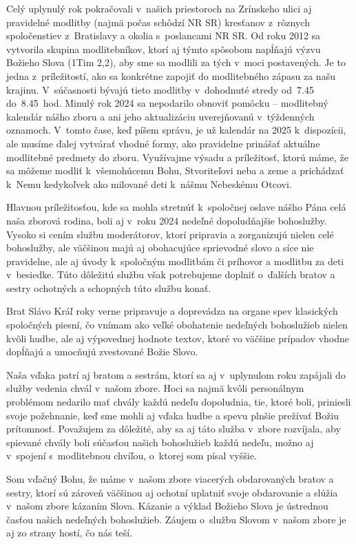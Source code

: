 Celý uplynulý rok pokračovali v~našich priestoroch na Zrínskeho ulici aj pravidelné modlitby (najmä počas schôdzí NR SR) kresťanov z~rôznych spoločenstiev z~Bratislavy a okolia s~poslancami NR SR. Od roku 2012 sa vytvorila skupina modlitebníkov, ktorí aj týmto spôsobom napĺňajú výzvu Božieho Slova (1Tim 2,2), aby sme sa modlili za tých v~moci postavených. Je to jedna z~príležitostí, ako sa konkrétne zapojiť do modlitebného zápasu za našu krajinu. V~súčasnosti bývajú tieto modlitby v~dohodnuté stredy od~7.45 do~8.45~hod.
Minulý rok 2024 sa nepodarilo obnoviť pomôcku -- modlitebný kalendár nášho zboru a ani jeho aktualizáciu uverejňovanú v~týždenných oznamoch. V~tomto čase, keď píšem správu, je už kalendár na 2025 k~dispozícii, ale musíme ďalej vytvárať vhodné formy, ako pravidelne prinášať aktuálne modlitebné predmety do zboru.
Využívajme výsadu a príležitosť, ktorú máme, že sa môžeme modliť k~všemohúcemu Bohu, Stvoriteľovi neba a zeme a prichádzať k~Nemu kedykoľvek ako milované deti k~nášmu Nebeskému Otcovi.


Hlavnou príležitosťou, kde sa mohla stretnúť k~spoločnej oslave nášho Pána celá naša zborová rodina, boli aj v~roku 2024 nedeľné dopoludňajšie bohoslužby. Vysoko si cením službu moderátorov, ktorí pripravia a zorganizujú nielen celé bohoslužby, ale väčšinou majú aj obohacujúce sprievodné slovo a síce nie pravidelne, ale aj úvody k~spoločným modlitbám či príhovor a modlitbu za deti v~besiedke. Túto dôležitú službu však potrebujeme doplniť o~ďalších bratov a sestry ochotných a schopných túto službu konať.

Brat Slávo Kráľ roky verne pripravuje a doprevádza na organe spev klasických spoločných piesní, čo vnímam ako veľké obohatenie nedeľných bohoslužieb nielen kvôli hudbe, ale aj výpovednej hodnote textov, ktoré vo väčšine prípadov vhodne dopĺňajú a umocňujú zvestované Božie Slovo.

Naša vďaka patrí aj bratom a sestrám, ktorí sa aj v~uplynulom roku zapájali do služby vedenia chvál v~našom zbore. Hoci sa najmä kvôli personálnym problémom nedarilo mať chvály každú nedeľu dopoludnia, tie, ktoré boli, priniesli svoje požehnanie, keď sme mohli aj vďaka hudbe a spevu plnšie prežívať Božiu prítomnosť. Považujem za dôležité, aby sa aj táto služba v~zbore rozvíjala, aby spievané chvály boli súčasťou našich bohoslužieb každú nedeľu, možno aj v~spojení s~modlitebnou chvíľou, o~ktorej som písal vyššie.

Som vďačný Bohu, že máme v~našom zbore viacerých obdarovaných bratov a sestry, ktorí sú zároveň väčšinou aj ochotní uplatniť svoje obdarovanie a slúžia v~našom zbore kázaním Slova. Kázanie a výklad Božieho Slova je ústrednou časťou našich nedeľných bohoslužieb. Záujem o~službu Slovom v~našom zbore je aj zo strany hostí, čo nás teší.

